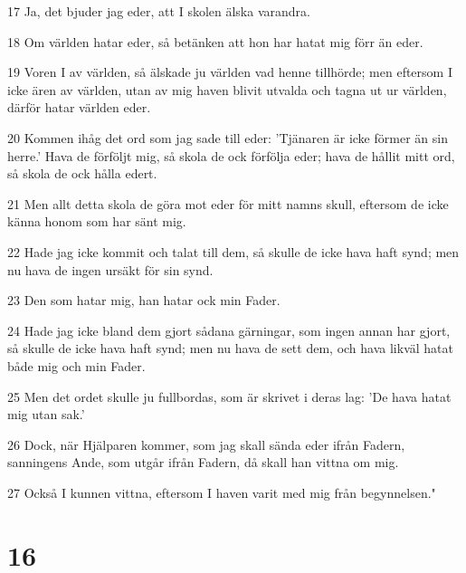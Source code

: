 \par 17 Ja, det bjuder jag eder, att I skolen älska varandra.
\par 18 Om världen hatar eder, så betänken att hon har hatat mig förr än eder.
\par 19 Voren I av världen, så älskade ju världen vad henne tillhörde; men eftersom I icke ären av världen, utan av mig haven blivit utvalda och tagna ut ur världen, därför hatar världen eder.
\par 20 Kommen ihåg det ord som jag sade till eder: 'Tjänaren är icke förmer än sin herre.' Hava de förföljt mig, så skola de ock förfölja eder; hava de hållit mitt ord, så skola de ock hålla edert.
\par 21 Men allt detta skola de göra mot eder för mitt namns skull, eftersom de icke känna honom som har sänt mig.
\par 22 Hade jag icke kommit och talat till dem, så skulle de icke hava haft synd; men nu hava de ingen ursäkt för sin synd.
\par 23 Den som hatar mig, han hatar ock min Fader.
\par 24 Hade jag icke bland dem gjort sådana gärningar, som ingen annan har gjort, så skulle de icke hava haft synd; men nu hava de sett dem, och hava likväl hatat både mig och min Fader.
\par 25 Men det ordet skulle ju fullbordas, som är skrivet i deras lag: 'De hava hatat mig utan sak.'
\par 26 Dock, när Hjälparen kommer, som jag skall sända eder ifrån Fadern, sanningens Ande, som utgår ifrån Fadern, då skall han vittna om mig.
\par 27 Också I kunnen vittna, eftersom I haven varit med mig från begynnelsen."

\chapter{16}

